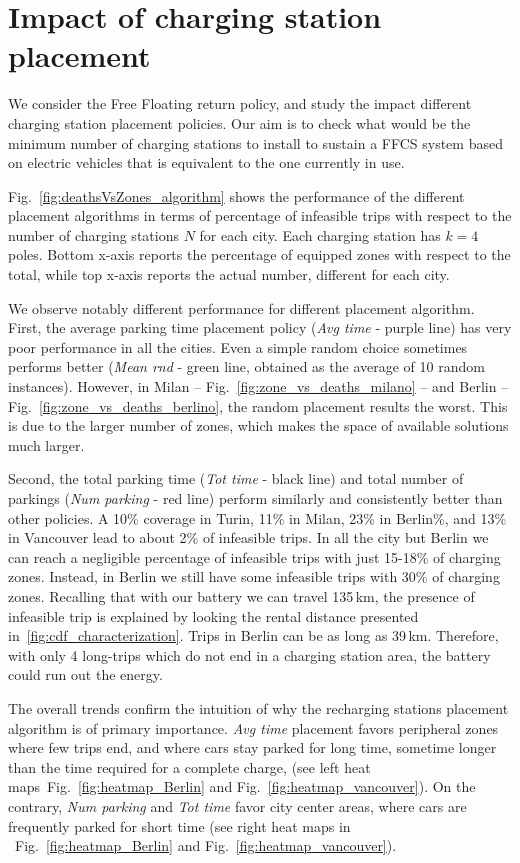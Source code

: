 \section{Impact of charging station placement}
\label{sec:freefloating}

We consider the Free Floating return policy, and study the impact different charging station placement policies. Our aim is to check what would be the minimum number of charging stations to install to sustain a FFCS system based on electric vehicles that is equivalent to the one currently in use.

Fig.~\ref{fig:deathsVsZones_algorithm} shows the performance of the different placement algorithms in terms of percentage of infeasible trips  with respect to  the number of charging stations $N$ for each city. Each charging station has $k=4$ poles. Bottom x-axis reports the percentage of equipped zones with respect to the total, while top x-axis reports the actual number, different for each city.

We observe notably different performance for different placement algorithm.
First, the average parking time placement policy (\textit{Avg time} - purple line) has very poor performance in all the cities.
Even a simple random choice sometimes performs better (\textit{Mean rnd} - green line, obtained as the average of 10 random instances). 
However, in Milan -- Fig.~\ref{fig:zone_vs_deaths_milano} -- and Berlin -- Fig.~\ref{fig:zone_vs_deaths_berlino}, the random placement results the worst. This is due to the larger number of zones, which makes the space of available solutions much larger.

Second, the total parking time  (\textit{Tot time} - black line) and total number of parkings (\textit{Num parking} - red line) perform similarly and consistently better than other policies. A 10\% coverage in Turin, 11\% in Milan, 23\% in Berlin\%, and 13\% in Vancouver lead to about 2\% of infeasible trips. 
In all the city but Berlin we can reach a negligible percentage of infeasible trips with just 15-18\% of charging zones. Instead, in Berlin we still have some infeasible trips with 30\% of charging zones. Recalling that with our battery we can travel 135\,km, the presence of infeasible trip is explained by looking the rental distance presented in~\ref{fig:cdf_characterization}. Trips in Berlin can be as long as 39\,km. Therefore, with only 4 long-trips which do not end in a charging station area, the battery could run out the energy.

The overall trends confirm the intuition of why the recharging stations placement algorithm is of primary importance. \textit{Avg time} placement favors peripheral zones where few trips end, and where cars stay parked for long time, sometime longer than the time required for a complete charge, (see left heat maps~Fig.~\ref{fig:heatmap_Berlin} and Fig.~\ref{fig:heatmap_vancouver}). On the contrary, \textit{Num parking} and \textit{Tot time} favor city center areas, where cars  are frequently parked for short time (see right heat maps in ~Fig.~\ref{fig:heatmap_Berlin} and Fig.~\ref{fig:heatmap_vancouver}). 

